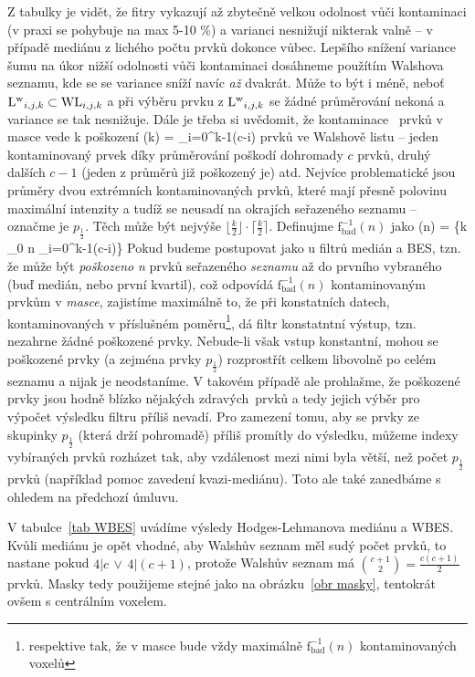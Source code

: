     Z tabulky je vidět, že fitry vykazují až zbytečně velkou odolnost vůči kontaminaci (v praxi se pohybuje na max 5-10 \%) a varianci nesnižují nikterak valně -- v případě mediánu z lichého počtu prvků dokonce vůbec. Lepšího snížení variance šumu na úkor nižší odolnosti vůči kontaminaci dosáhneme použítím Walshova seznamu, kde se se variance sníží navíc \emph{až} dvakrát. Může to být i méně, neboť ${\mathrm{L^w}_{i,j,k}} \subset {\mathrm{WL}_{i,j,k}}$ a při výběru prvku z ${\mathrm{L^w}_{i,j,k}}$ se žádné průměrování nekoná a variance se tak nesnižuje. Dále je třeba si uvědomit, že kontaminace \kk~prvků v masce vede k poškození
    \beq
    (k) = \sum_{i=0}^{k-1}(c-i)
    \eeq
    prvků ve Walshově listu -- jeden kontaminovaný prvek díky průměrování poškodí dohromady $c$ prvků, druhý dalších $c-1$ (jeden z průměrů již poškozený je) atd. Nejvíce problematické jsou průměry dvou extrémních kontaminovaných prvků, které mají přesně polovinu maximální intenzity a tudíž se neusadí na okrajích seřazeného seznamu -- označme je $p_{\frac{1}{2}}$. Těch může být nejvýše $\lfloor\frac{k}{2}\rfloor\cdot\lceil\frac{k}{2}\rceil$. Definujme $\mathrm{f_{bad}^{-1}}(n)$ jako
    \beq
    (n) = \max\bigg\{k \in \Nn_0 \;\bigg\vert\; n \geq \sum_{i=0}^{k-1}(c-i)\bigg\}
    \eeq
    Pokud budeme postupovat jako u filtrů medián a BES, tzn. že může být \emph{poškozeno} \textit{n} prvků seřazeného \emph{seznamu} až do prvního vybraného (buď medián, nebo první kvartil), což odpovídá $\mathrm{f_{bad}^{-1}}(n)$ kontaminovaným prvkům v \emph{masce}, zajistíme maximálně to, že při konstatních datech, kontaminovaných v příslušném poměru\footnote{respektive tak, že v masce bude vždy maximálně $\mathrm{f_{bad}^{-1}}(n)$ kontaminovaných voxelů}, dá filtr konstatntní výstup, tzn. nezahrne žádné poškozené prvky. Nebude-li však vstup konstantní, mohou se poškozené prvky (a zejména prvky $p_{\frac{1}{2}}$) rozprostřít celkem libovolně po celém seznamu a nijak je neodstaníme. V takovém případě ale prohlašme, že poškozené prvky jsou hodně blízko nějakých \bq zdravých\eq ~prvků a tedy jejich výběr pro výpočet výsledku filtru příliš nevadí. Pro zamezení tomu, aby se prvky ze skupinky $p_{\frac{1}{2}}$ (která drží pohromadě) příliš promítly do výsledku, můžeme indexy vybíraných prvků rozházet tak, aby vzdálenost mezi nimi byla větší, než počet $p_{\frac{1}{2}}$ prvků (například pomoc zavedení kvazi-mediánu). Toto ale také zanedbáme s ohledem na předchozí úmluvu.

    V tabulce~\ref{tab WBES} uvádíme výsledy Hodges-Lehmanova mediánu a WBES. Kvůli mediánu je opět vhodné, aby Walshův seznam měl sudý počet prvků, to nastane pokud $4|c \,\vee\, 4|(c+1)$, protože Walshův seznam má ${c+1 \choose 2} = \frac{c(c+1)}{2}$ prvků. Masky tedy použijeme stejné jako na obrázku~\ref{obr masky}, tentokrát ovšem s centrálním voxelem.

